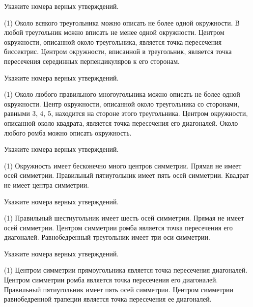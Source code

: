\begin{class}[number=2]
	\begin{listofex}
			\item Укажите номера верных утверждений.
		\begin{tasks}(1)
			\task Около всякого треугольника можно описать не более одной окружности.
			\task В любой треугольник можно вписать не менее одной окружности.
			\task Центром окружности, описанной около треугольника, является точка пересечения биссектрис.
			\task Центром окружности, вписанной в треугольник, является точка пересечения серединных перпендикуляров к его сторонам.
		\end{tasks}
		\item Укажите номера верных утверждений.
		\begin{tasks}(1)
			\task Около любого правильного многоугольника можно описать не более одной окружности.
			\task Центр окружности, описанной около треугольника со сторонами, равными \( 3 \), \( 4 \), \( 5 \), находится на стороне этого треугольника.
			\task Центром окружности, описанной около квадрата, является точка пересечения его диагоналей.
			\task Около любого ромба можно описать окружность.
		\end{tasks}
		\item Укажите номера верных утверждений.
		\begin{tasks}(1)
			\task Окружность имеет бесконечно много центров симметрии.
			\task Прямая не имеет осей симметрии.
			\task Правильный пятиугольник имеет пять осей симметрии.
			\task Квадрат не имеет центра симметрии.
		\end{tasks}
		\item Укажите номера верных утверждений.
		\begin{tasks}(1)
			\task Правильный шестиугольник имеет шесть осей симметрии.
			\task Прямая не имеет осей симметрии.
			\task Центром симметрии ромба является точка пересечения его диагоналей.
			\task Равнобедренный треугольник имеет три оси симметрии.
		\end{tasks}
	\newpage
		\item Укажите номера верных утверждений.
		\begin{tasks}(1)
			\task Центром симметрии прямоугольника является точка пересечения диагоналей.
			\task Центром симметрии ромба является точка пересечения его диагоналей.
			\task Правильный пятиугольник имеет пять осей симметрии.
			\task Центром симметрии равнобедренной трапеции является точка пересечения ее диагоналей.

\end{tasks}
\end{listofex}
\end{class}
